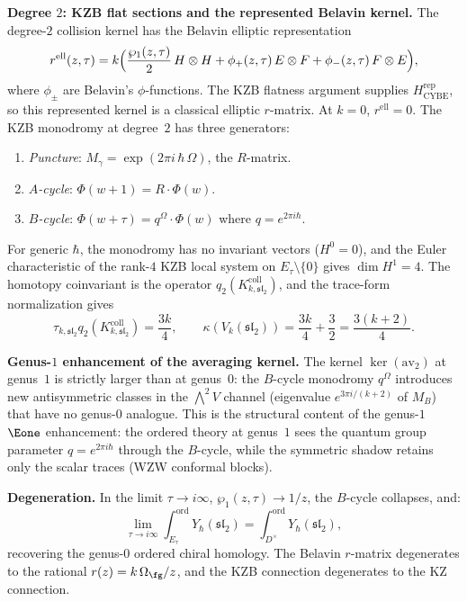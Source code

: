 \begin{example}
\smallskip
\noindent
\textbf{Degree $2$: KZB flat sections and the represented Belavin
kernel.}
The degree-$2$ collision kernel has the Belavin elliptic
representation
\begin{equation}\label{eq:v1-belavin-r}
 r^{\mathrm{ell}}(z, \tau)
 = k \Bigl(
 \frac{\wp_1(z, \tau)}{2}\,H \otimes H
 + \phi_+(z, \tau)\,E \otimes F
 + \phi_-(z, \tau)\,F \otimes E
 \Bigr),
\end{equation}
where $\phi_\pm$ are Belavin's $\phi$-functions.
The KZB flatness argument supplies
$H_{\mathrm{CYBE}}^{\mathrm{rep}}$, so this represented kernel is a
classical elliptic $r$-matrix.
At $k = 0$, $r^{\mathrm{ell}} = 0$.
The KZB monodromy at degree~$2$ has three generators:
\begin{enumerate}[label=\textup{(\roman*)}]
\item \emph{Puncture}: $M_\gamma
 = \exp(2\pi i\,\hbar\,\Omega)$, the $R$-matrix.
\item \emph{$A$-cycle}: $\Phi(w+1) = R\cdot\Phi(w)$.
\item \emph{$B$-cycle}: $\Phi(w+\tau)
 = q^{\Omega}\cdot\Phi(w)$ where
 $q = e^{2\pi i \hbar}$.
\end{enumerate}
For generic $\hbar$, the monodromy has no invariant
vectors ($H^0 = 0$), and the Euler characteristic of the
rank-$4$ KZB local system on $E_\tau \setminus \{0\}$ gives
$\dim H^1 = 4$.  The homotopy coinvariant is the operator
$q_2(K_{k,\mathfrak{sl}_2}^{\mathrm{coll}})$, and the trace-form
normalization gives
\[
 \tau_{k,\mathfrak{sl}_2}
 q_2(K_{k,\mathfrak{sl}_2}^{\mathrm{coll}})=\frac{3k}{4},
 \qquad
 \kappa(V_k(\mathfrak{sl}_2))=\frac{3k}{4}+\frac32
 =\frac{3(k+2)}4.
\]

\smallskip
\noindent
\textbf{Genus-$1$ enhancement of the averaging kernel.}
The kernel $\ker(\mathrm{av}_2)$ at genus~$1$ is strictly
larger than at genus~$0$: the $B$-cycle monodromy
$q^{\Omega}$ introduces new antisymmetric classes in the
$\bigwedge^2 V$ channel (eigenvalue
$e^{3\pi i/(k+2)}$ of $M_B$) that have no genus-$0$
analogue. This is the structural content of the genus-$1$
$\Eone$ enhancement: the ordered theory at genus~$1$ sees
the quantum group parameter $q = e^{2\pi i \hbar}$ through
the $B$-cycle, while the symmetric shadow retains only
the scalar traces (WZW conformal blocks).

\smallskip
\noindent
\textbf{Degeneration.} In the limit $\tau \to i\infty$,
$\wp_1(z,\tau) \to 1/z$, the $B$-cycle collapses, and:
\begin{equation}\label{eq:v1-ell-degen}
 \lim_{\tau \to i\infty}
 \int_{E_\tau}^{\mathrm{ord}}
 Y_\hbar(\mathfrak{sl}_2)
 = \int_{D^\times}^{\mathrm{ord}}
 Y_\hbar(\mathfrak{sl}_2),
\end{equation}
recovering the genus-$0$ ordered chiral homology. The
Belavin $r$-matrix degenerates to the rational
$r(z) = k\,\Omega_{\fg}/z$, and the KZB connection
degenerates to the KZ connection.
\end{example}


